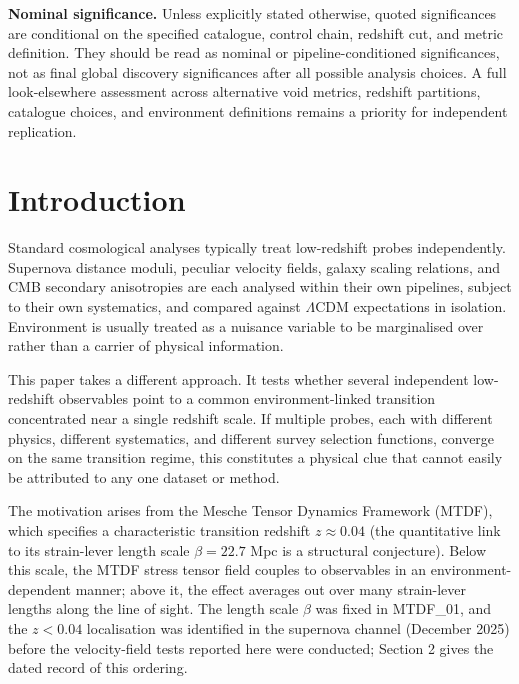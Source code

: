 \documentclass[11pt,a4paper]{article}
\begin{document}
\begin{mdframed}[linecolor=accent,linewidth=0.5pt,backgroundcolor=callout-bg,leftline=true,rightline=true,topline=true,bottomline=true,innerleftmargin=8pt,innerrightmargin=8pt,innertopmargin=6pt,innerbottommargin=6pt]
\textbf{Nominal significance.} Unless explicitly stated otherwise, quoted significances are conditional on the specified catalogue, control chain, redshift cut, and metric definition. They should be read as nominal or pipeline-conditioned significances, not as final global discovery significances after all possible analysis choices. A full look-elsewhere assessment across alternative void metrics, redshift partitions, catalogue choices, and environment definitions remains a priority for independent replication.
\end{mdframed}


\section{Introduction}
\label{sec:sec1}
Standard cosmological analyses typically treat low-redshift probes independently. Supernova distance moduli, peculiar velocity fields, galaxy scaling relations, and CMB secondary anisotropies are each analysed within their own pipelines, subject to their own systematics, and compared against \(\Lambda\)CDM expectations in isolation. Environment is usually treated as a nuisance variable to be marginalised over rather than a carrier of physical information.

This paper takes a different approach. It tests whether several independent low-redshift observables point to a common environment-linked transition concentrated near a single redshift scale. If multiple probes, each with different physics, different systematics, and different survey selection functions, converge on the same transition regime, this constitutes a physical clue that cannot easily be attributed to any one dataset or method.

The motivation arises from the Mesche Tensor Dynamics Framework (MTDF), which specifies a characteristic transition redshift \(z \approx 0.04\) (the quantitative link to its strain-lever length scale \(\beta = 22.7\) Mpc is a structural conjecture). Below this scale, the MTDF stress tensor field couples to observables in an environment-dependent manner; above it, the effect averages out over many strain-lever lengths along the line of sight. The length scale \(\beta\) was fixed in MTDF\_\allowbreak{}01, and the \(z < 0.04\) localisation was identified in the supernova channel (December 2025) before the velocity-field tests reported here were conducted; Section 2 gives the dated record of this ordering.
\end{document}
